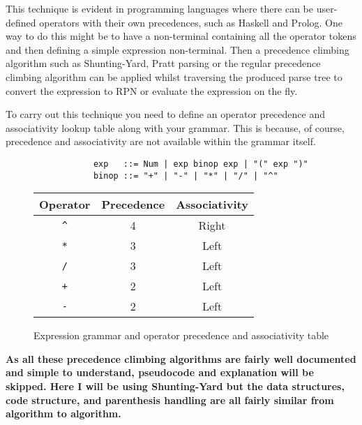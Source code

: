 This technique is evident in programming languages where there can be user-defined operators with their own precedences, such as Haskell and Prolog. One way to do this might be to have a non-terminal containing all the operator tokens and then defining a simple expression non-terminal. Then a precedence climbing algorithm such as Shunting-Yard, Pratt parsing or the regular precedence climbing algorithm\textsuperscript{\cite{operator-precedence-parser-wikipedia}} can be applied whilst traversing the produced parse tree to convert the expression to RPN or evaluate the expression on the fly.

To carry out this technique you need to define an operator precedence and associativity lookup table along with your grammar. This is because, of course, precedence and associativity are not available within the grammar itself.

\begin{figure}[H]
    \begin{center}
        \begin{verbatim}
            exp   ::= Num | exp binop exp | "(" exp ")"
            binop ::= "+" | "-" | "*" | "/" | "^"
        \end{verbatim}
        \vspace{1em}
        \begin{tabular}{| c | c | c |}
            \hline
            Operator & Precedence & Associativity\\
            \hline
            \verb|^| & 4 & Right\\
            \hline
            \verb|*| & 3 & Left\\
            \hline
            \verb|/| & 3 & Left\\
            \hline
            \verb|+| & 2 & Left\\
            \hline
            \verb|-| & 2 & Left\\
            \hline
        \end{tabular}
    \end{center}
    \vspace{-1em}
    \caption{\label{fig:4.6}Expression grammar and operator precedence and associativity table}
\end{figure}

\textbf{As all these precedence climbing algorithms are fairly well documented and simple to understand, pseudocode and explanation will be skipped. Here I will be using Shunting-Yard but the data structures, code structure, and parenthesis handling are all fairly similar from algorithm to algorithm.\textsuperscript{\cite{chu_2016}\cite{chu_2017}}}

